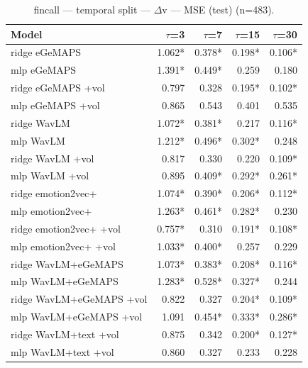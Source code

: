 \begin{table}[t]
\centering
\begin{tabular}{lrrrr}
\toprule
Model & $\tau$=3 & $\tau$=7 & $\tau$=15 & $\tau$=30 \\
\midrule
ridge eGeMAPS & 1.062* & 0.378* & 0.198* & 0.106* \\
mlp eGeMAPS & 1.391* & 0.449* & 0.259 & 0.180 \\
ridge eGeMAPS +vol & 0.797 & 0.328 & 0.195* & 0.102* \\
mlp eGeMAPS +vol & 0.865 & 0.543 & 0.401 & 0.535 \\
ridge WavLM & 1.072* & 0.381* & 0.217 & 0.116* \\
mlp WavLM & 1.212* & 0.496* & 0.302* & 0.248 \\
ridge WavLM +vol & 0.817 & 0.330 & 0.220 & 0.109* \\
mlp WavLM +vol & 0.895 & 0.409* & 0.292* & 0.261* \\
ridge emotion2vec+ & 1.074* & 0.390* & 0.206* & 0.112* \\
mlp emotion2vec+ & 1.263* & 0.461* & 0.282* & 0.230 \\
ridge emotion2vec+ +vol & 0.757* & 0.310 & 0.191* & 0.108* \\
mlp emotion2vec+ +vol & 1.033* & 0.400* & 0.257 & 0.229 \\
ridge WavLM+eGeMAPS & 1.073* & 0.383* & 0.208* & 0.116* \\
mlp WavLM+eGeMAPS & 1.283* & 0.528* & 0.327* & 0.244 \\
ridge WavLM+eGeMAPS +vol & 0.822 & 0.327 & 0.204* & 0.109* \\
mlp WavLM+eGeMAPS +vol & 1.091 & 0.454* & 0.333* & 0.286* \\
ridge WavLM+text +vol & 0.875 & 0.342 & 0.200* & 0.127* \\
mlp WavLM+text +vol & 0.860 & 0.327 & 0.233 & 0.228 \\
\bottomrule
\end{tabular}
\caption{fincall — temporal split — $\Delta$v — MSE (test) (n=483).}
\end{table}

